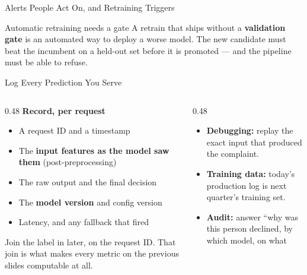 \begin{frame}{Alerts People Act On, and Retraining Triggers}
    \vspace{0.18em}
    \begin{alertblock}{Automatic retraining needs a gate}
        A retrain that ships without a \textbf{validation gate} is an automated way to deploy a worse model.
        The new candidate must beat the incumbent on a held-out set before it is promoted --- and the
        pipeline must be able to refuse.
    \end{alertblock}

\end{frame}

\begin{frame}{Log Every Prediction You Serve}

    \begin{columns}[T]
        \begin{column}{0.48\textwidth}
            \small
            \textbf{Record, per request}
            \begin{itemize}
                \item A request ID and a timestamp
                \item The \textbf{input features as the model saw them} (post-preprocessing)
                \item The raw output and the final decision
                \item The \textbf{model version} and config version
                \item Latency, and any fallback that fired
            \end{itemize}
            \vspace{0.4em}
            Join the label in later, on the request ID. That join is what makes every metric on the previous
            slides computable at all.
        \end{column}
        \begin{column}{0.48\textwidth}
            \begin{tcolorbox}[colback=blue!5, colframe=blue!50, title=\small What this buys you]
                \small
                \begin{itemize}
                    \item \textbf{Debugging:} replay the exact input that produced the complaint.
                    \item \textbf{Training data:} today's production log is next quarter's training set.
                    \item \textbf{Audit:} answer ``why was this person declined, by which model, on what

\end{itemize}
\end{tcolorbox}
\end{column}
\end{columns}
\end{frame}
